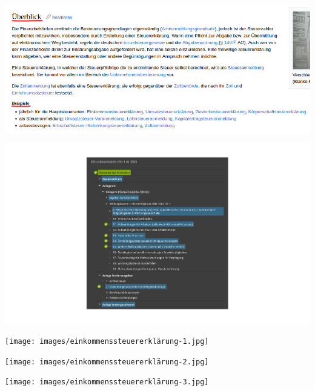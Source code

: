 \documentclass{beamer}
\begin{document}
		{
		\begin{frame}[plain]
			\begin{center}
				\includegraphics[width=\linewidth]{images/steuererklärung-überblick-1.jpg}
			\end{center}
		\end{frame}
		\begin{frame}[plain]
			\begin{center}
				\includegraphics[width=\linewidth]{images/steuererklärung-überblick-2.jpg}
			\end{center}
		\end{frame}
		\begin{frame}[plain]
			\begin{center}
				\texttt{[image: images/einkommenssteuererklärung-1.jpg]}
			\end{center}
		\end{frame}
		\begin{frame}[plain]
			\begin{center}
				\texttt{[image: images/einkommenssteuererklärung-2.jpg]}
			\end{center}
		\end{frame}
		\begin{frame}[plain]
			\begin{center}
				\texttt{[image: images/einkommenssteuererklärung-3.jpg]}
			\end{center}
		\end{frame}
		}
\end{document}
